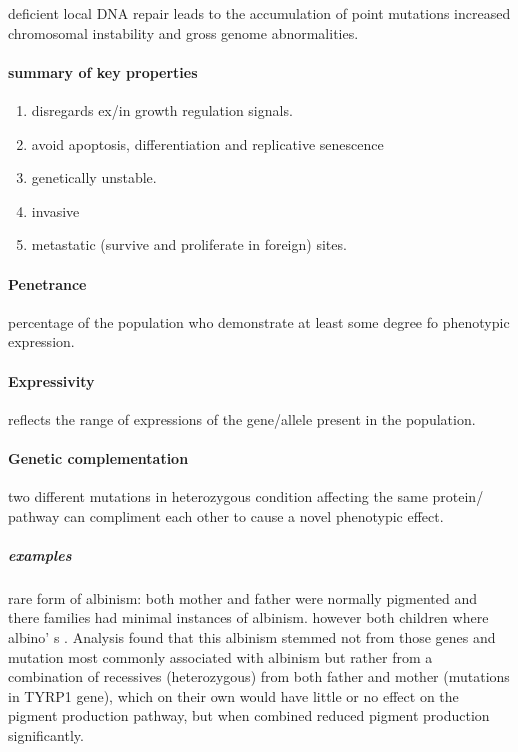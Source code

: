 \documentclass[]{article}
\providecommand{\tightlist}{%
  \setlength{\itemsep}{0pt}\setlength{\parskip}{0pt}}
\let\oldparagraph\paragraph
\renewcommand{\paragraph}[1]{\oldparagraph{#1}\mbox{}}
\let\oldsubparagraph\subparagraph
\renewcommand{\subparagraph}[1]{\oldsubparagraph{#1}\mbox{}}
\begin{document}
deficient local DNA repair leads to the accumulation of point mutations
increased chromosomal instability and gross genome abnormalities.

\hypertarget{summary-of-key-properties}{%
\paragraph{summary of key properties}\label{summary-of-key-properties}}

\begin{enumerate}
\def\labelenumi{\arabic{enumi}.}
\tightlist
\item
  disregards ex/in growth regulation signals.
\item
  avoid apoptosis, differentiation and replicative senescence
\item
  genetically unstable.
\item
  invasive
\item
  metastatic (survive and proliferate in foreign) sites.
\end{enumerate}

\hypertarget{penetrance}{%
\paragraph{Penetrance}\label{penetrance}}

percentage of the population who demonstrate at least some degree fo
phenotypic expression.

\hypertarget{expressivity}{%
\paragraph{Expressivity}\label{expressivity}}

reflects the range of expressions of the gene/allele present in the
population.

\hypertarget{genetic-complementation}{%
\paragraph{Genetic complementation}\label{genetic-complementation}}

two different mutations in heterozygous condition affecting the same
protein/ pathway can compliment each other to cause a novel phenotypic
effect.

\hypertarget{examples-1}{%
\subparagraph{examples}\label{examples-1}}

rare form of albinism: both mother and father were normally pigmented
and there families had minimal instances of albinism. however both
children where albino' s . Analysis found that this albinism stemmed not
from those genes and mutation most commonly associated with albinism but
rather from a combination of recessives (heterozygous) from both father
and mother (mutations in TYRP1 gene), which on their own would have
little or no effect on the pigment production pathway, but when combined
reduced pigment production significantly.
\end{document}
